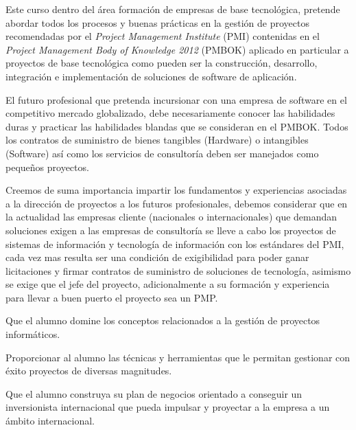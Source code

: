 \begin{syllabus}


\begin{justification}
Este curso dentro del área formación de empresas de base tecnológica, 
pretende abordar todos los procesos y buenas prácticas en la 
gestión de proyectos recomendadas por el \textit{Project Management Institute} (PMI) 
contenidas en el \textit{Project Management Body of Knowledge 2012} (PMBOK)  
aplicado en particular a proyectos de base tecnológica como pueden ser la 
construcción, desarrollo, integración e implementación de soluciones de 
software de aplicación.

El futuro profesional que pretenda incursionar con una empresa de 
software en el competitivo mercado globalizado, debe necesariamente 
conocer las habilidades duras y practicar las habilidades blandas que se 
consideran en el PMBOK. Todos los contratos de suministro de bienes 
tangibles (Hardware) o intangibles (Software) así como los servicios de 
consultoría deben ser manejados como pequeños proyectos.

Creemos de suma importancia impartir los fundamentos y experiencias 
asociadas a la dirección de proyectos a los futuros profesionales, 
debemos considerar que en la actualidad las empresas cliente 
(nacionales o internacionales) que demandan soluciones exigen a 
las empresas de consultoría se lleve a cabo los proyectos de sistemas 
de información y tecnología de información con los estándares del PMI, 
cada vez mas resulta ser una condición de exigibilidad para poder ganar 
licitaciones y firmar contratos de suministro de soluciones de tecnología, 
asimismo se exige que el jefe del proyecto, adicionalmente a su formación y 
experiencia para llevar a buen puerto el proyecto sea un PMP.
\end{justification}

\begin{goals}
\item Que el alumno domine los conceptos relacionados a la gestión de proyectos informáticos.
\item Proporcionar al alumno las técnicas y herramientas que le permitan gestionar con éxito proyectos de diversas magnitudes.
\item Que el alumno construya su plan de negocios orientado a conseguir un inversionista internacional que pueda impulsar y proyectar a la empresa a un ámbito internacional.
\end{goals}


\end{syllabus}
